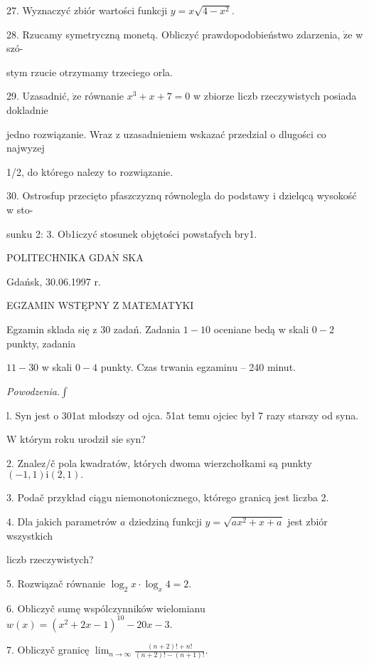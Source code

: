 \documentclass[a4paper,12pt]{article}
\begin{document}
27. Wyznaczyć zbiór wartości funkcji $y=x\sqrt{4-x^{2}}.$

28. Rzucamy symetryczną monetą. Obliczyć prawdopodobieństwo zdarzenia, $\dot{\mathrm{z}}\mathrm{e}$ w szó-

stym rzucie otrzymamy trzeciego orla.

29. Uzasadnić, $\dot{\mathrm{z}}\mathrm{e}$ równanie $x^{3}+x+7=0$ w zbiorze liczb rzeczywistych posiada dokladnie

jedno rozwiązanie. Wraz z uzasadnieniem wskazać przedzial o dlugości co najwyzej

1/2, do którego nalezy to rozwiązanie.

30. Ostrosfup przecięto pfaszczyznq równolegla do podstawy i dzielqcą wysokość w sto-

sunku 2: 3. Ob1iczyć stosunek objętości powstafych bry1.







POLITECHNIKA $\mathrm{G}\mathrm{D}\mathrm{A}\acute{\mathrm{N}}$ SKA

Gdańsk, 30.06.1997 r.

EGZAMIN WSTĘPNY Z MATEMATYKI

Egzamin sklada się z 30 zadań. Zadania $1-10$ oceniane bedą w skali $0-2$ punkty, zadania

$11-30$ w skali $0-4$ punkty. Czas trwania egzaminu -- 240 minut.

{\it Powodzenia}.$\displaystyle \int$

l. Syn jest o 301at młodszy od ojca. 51at temu ojciec był 7 razy starszy od syna.

$\mathrm{W}$ którym roku urodził $\mathrm{s}\mathrm{i}\mathrm{e}$ syn?

2. Znalez/č pola kwadratów, których dwoma wierzchołkami są punkty $(-1,1)\mathrm{i}(2,1).$

3. Podač przykład ciągu niemonotonicznego, którego granicą jest liczba 2.

4. Dla jakich parametrów $a$ dziedziną funkcji $y = \sqrt{ax^{2}+x+a}$ jest zbiór wszystkich

liczb rzeczywistych?

5. Rozwiązač równanie $\log_{2}x\cdot\log_{x}4=2.$

6. Obliczyč sumę wspólczynników wielomianu $w(x)=(x^{2}+2x-1)^{10}-20x-3.$

7. Obliczyč granicę $\displaystyle \lim_{n\rightarrow\infty}\frac{(n+2)!+n!}{(n+2)!-(n+1)!}.$
\end{document}

